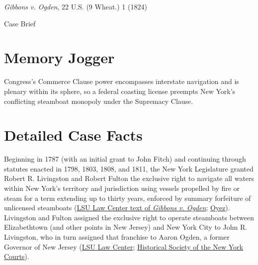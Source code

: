 \documentclass[12pt]{article}
\begin{document}
\begin{center}
{\LARGE \textit{Gibbons v. Ogden}, 22 U.S. (9 Wheat.) 1 (1824)\par}
\vspace{0.8em}
{\large Case Brief\par}
\end{center}
\vspace{1em}

\section{Memory Jogger}
Congress's Commerce Clause power encompasses interstate navigation and is plenary within its sphere, so a federal coasting license preempts New York's conflicting steamboat monopoly under the Supremacy Clause.

\section{Detailed Case Facts}
Beginning in 1787 (with an initial grant to John Fitch) and continuing through statutes enacted in 1798, 1803, 1808, and 1811, the New York Legislature granted Robert R. Livingston and Robert Fulton the exclusive right to navigate all waters within New York's territory and jurisdiction using vessels propelled by fire or steam for a term extending up to thirty years, enforced by summary forfeiture of unlicensed steamboats (\href{https://biotech.law.lsu.edu/cases/pp/Gibbons.htm}{LSU Law Center text of \textit{Gibbons v. Ogden}}; \href{https://www.oyez.org/cases/1789-1850/22us1}{Oyez}). Livingston and Fulton assigned the exclusive right to operate steamboats between Elizabethtown (and other points in New Jersey) and New York City to John R. Livingston, who in turn assigned that franchise to Aaron Ogden, a former Governor of New Jersey (\href{https://biotech.law.lsu.edu/cases/pp/Gibbons.htm}{LSU Law Center}; \href{https://history.nycourts.gov/wp-content/uploads/2026/05/25_Judicial_Notice-compressed.pdf}{Historical Society of the New York Courts}).
\end{document}

